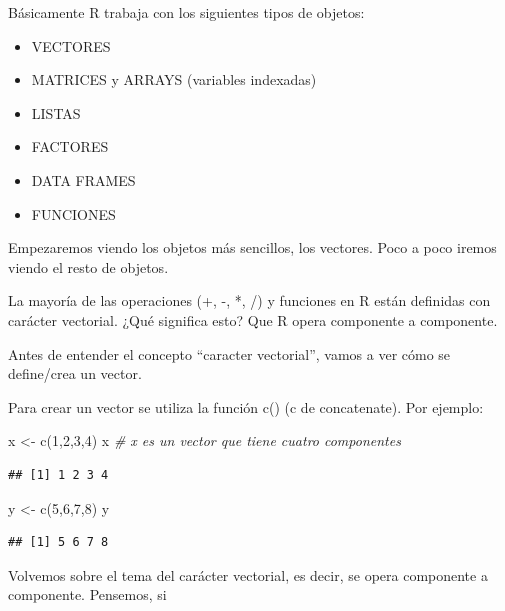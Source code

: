 \documentclass[
]{book}
\newenvironment{Shaded}{\begin{snugshade}}{\end{snugshade}}
\newcommand{\CommentTok}[1]{\textcolor[rgb]{0.56,0.35,0.01}{\textit{#1}}}
\newcommand{\DecValTok}[1]{\textcolor[rgb]{0.00,0.00,0.81}{#1}}
\newcommand{\FunctionTok}[1]{\textcolor[rgb]{0.00,0.00,0.00}{#1}}
\newcommand{\NormalTok}[1]{#1}
\newcommand{\OtherTok}[1]{\textcolor[rgb]{0.56,0.35,0.01}{#1}}
\begin{document}
Básicamente R trabaja con los siguientes tipos de objetos:

\begin{itemize}
\item
  VECTORES
\item
  MATRICES y ARRAYS (variables indexadas)
\item
  LISTAS
\item
  FACTORES
\item
  DATA FRAMES
\item
  FUNCIONES
\end{itemize}

Empezaremos viendo los objetos más sencillos, los vectores. Poco a poco iremos viendo el resto de objetos.

La mayoría de las operaciones (+, -, *, /) y funciones en R están definidas con carácter vectorial. ¿Qué significa esto? Que R opera componente a componente.

Antes de entender el concepto ``caracter vectorial'', vamos a ver cómo se define/crea un vector.

Para crear un vector se utiliza la función c() (c de concatenate). Por ejemplo:

\begin{Shaded}
\begin{Highlighting}[]
\NormalTok{x }\OtherTok{\textless{}{-}} \FunctionTok{c}\NormalTok{(}\DecValTok{1}\NormalTok{,}\DecValTok{2}\NormalTok{,}\DecValTok{3}\NormalTok{,}\DecValTok{4}\NormalTok{)}
\NormalTok{x                  }\CommentTok{\# x es un vector que tiene cuatro componentes}
\end{Highlighting}
\end{Shaded}

\begin{verbatim}
## [1] 1 2 3 4
\end{verbatim}

\begin{Shaded}
\begin{Highlighting}[]
\NormalTok{y }\OtherTok{\textless{}{-}} \FunctionTok{c}\NormalTok{(}\DecValTok{5}\NormalTok{,}\DecValTok{6}\NormalTok{,}\DecValTok{7}\NormalTok{,}\DecValTok{8}\NormalTok{)}
\NormalTok{y}
\end{Highlighting}
\end{Shaded}

\begin{verbatim}
## [1] 5 6 7 8
\end{verbatim}

Volvemos sobre el tema del carácter vectorial, es decir, se opera componente a componente. Pensemos, si
\end{document}
